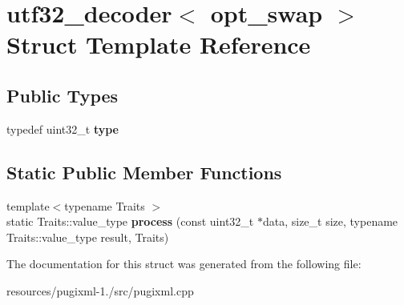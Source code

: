 \hypertarget{structutf32__decoder}{\section{utf32\+\_\+decoder$<$ opt\+\_\+swap $>$ Struct Template Reference}
\label{structutf32__decoder}
}
\subsection*{Public Types}
\begin{DoxyCompactItemize}
\item 
\hypertarget{structutf32__decoder_a817a1ba432d377e183ece6d448b7418d}{typedef uint32\+\_\+t {\bfseries type}}\label{structutf32__decoder_a817a1ba432d377e183ece6d448b7418d}

\end{DoxyCompactItemize}
\subsection*{Static Public Member Functions}
\begin{DoxyCompactItemize}
\item 
\hypertarget{structutf32__decoder_ac23eaccb8e66b323c3509b0c2307bc3f}{{\footnotesize template$<$typename Traits $>$ }\\static Traits\+::value\+\_\+type {\bfseries process} (const uint32\+\_\+t $\ast$data, size\+\_\+t size, typename Traits\+::value\+\_\+type result, Traits)}\label{structutf32__decoder_ac23eaccb8e66b323c3509b0c2307bc3f}

\end{DoxyCompactItemize}


The documentation for this struct was generated from the following file\+:\begin{DoxyCompactItemize}
\item 
resources/pugixml-\/1./src/pugixml.\+cpp\end{DoxyCompactItemize}
